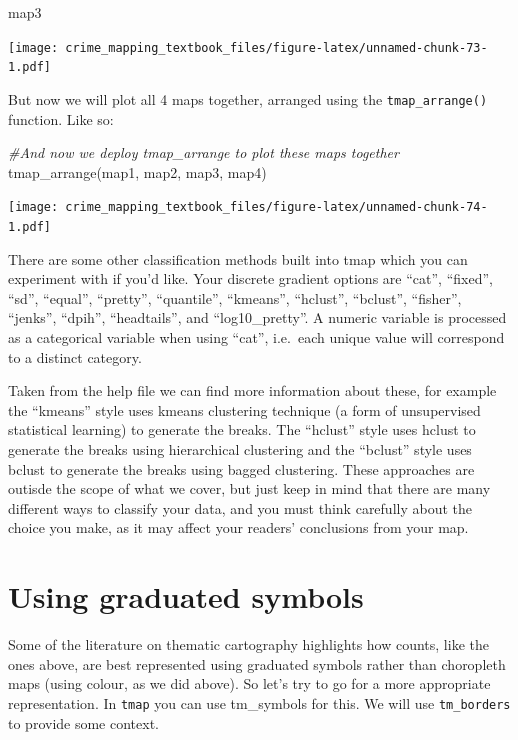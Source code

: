 \documentclass[
]{book}
\newenvironment{Shaded}{\begin{snugshade}}{\end{snugshade}}
\newcommand{\CommentTok}[1]{\textcolor[rgb]{0.56,0.35,0.01}{\textit{#1}}}
\newcommand{\FunctionTok}[1]{\textcolor[rgb]{0.00,0.00,0.00}{#1}}
\newcommand{\NormalTok}[1]{#1}
\begin{document}
\begin{Shaded}
\begin{Highlighting}[]
\NormalTok{map3}
\end{Highlighting}
\end{Shaded}

\texttt{[image: crime\_mapping\_textbook\_files/figure-latex/unnamed-chunk-73-1.pdf]}

But now we will plot all 4 maps together, arranged using the \texttt{tmap\_arrange()} function. Like so:

\begin{Shaded}
\begin{Highlighting}[]
\CommentTok{\#And now we deploy tmap\_arrange to plot these maps together}
\FunctionTok{tmap\_arrange}\NormalTok{(map1, map2, map3, map4) }
\end{Highlighting}
\end{Shaded}

\texttt{[image: crime\_mapping\_textbook\_files/figure-latex/unnamed-chunk-74-1.pdf]}

There are some other classification methods built into tmap which you can experiment with if you'd like. Your discrete gradient options are ``cat'', ``fixed'', ``sd'', ``equal'', ``pretty'', ``quantile'', ``kmeans'', ``hclust'', ``bclust'', ``fisher'', ``jenks'', ``dpih'', ``headtails'', and ``log10\_pretty''. A numeric variable is processed as a categorical variable when using ``cat'', i.e.~each unique value will correspond to a distinct category.

Taken from the help file we can find more information about these, for example the ``kmeans'' style uses kmeans clustering technique (a form of unsupervised statistical learning) to generate the breaks. The ``hclust'' style uses hclust to generate the breaks using hierarchical clustering and the ``bclust'' style uses bclust to generate the breaks using bagged clustering. These approaches are outisde the scope of what we cover, but just keep in mind that there are many different ways to classify your data, and you must think carefully about the choice you make, as it may affect your readers' conclusions from your map.

\hypertarget{using-graduated-symbols}{%
\section{Using graduated symbols}\label{using-graduated-symbols}}

Some of the literature on thematic cartography highlights how counts, like the ones above, are best represented using graduated symbols rather than choropleth maps (using colour, as we did above). So let's try to go for a more appropriate representation. In \texttt{tmap} you can use tm\_symbols for this. We will use \texttt{tm\_borders} to provide some context.
\end{document}
